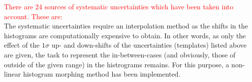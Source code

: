 \textcolor{red}{There are 24 sources of systematic uncertainties which have been taken into account. These are:} \\


The systematic uncertainties require an interpolation method as the shifts in the histograms are computationally expensive to obtain. In other words, as only the effect of the $1\sigma$ up- and down-shifts of the uncertainties (templates) listed above are given, the task to represent the in-between-cases (and obviously, those of outside of the given range) in the histrograms remains. For this purpose, a non-linear histogram morphing method has been implemented.

